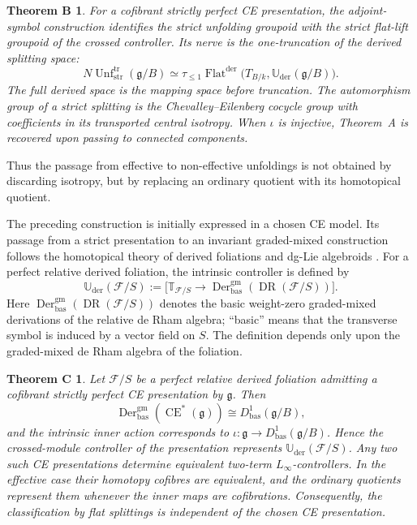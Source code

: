 \documentclass[11pt,reqno,a4paper,dvipsnames,x11names]{amsart}
\numberwithin{equation}{section}
\theoremstyle{plain}
\newtheorem*{theoremB}{Theorem B}
\newtheorem*{theoremC}{Theorem C}
\theoremstyle{definition}
\theoremstyle{remark}
\DeclareMathOperator{\Der}{Der}
\DeclareMathOperator{\CE}{CE}
\DeclareMathOperator{\DR}{DR}
\newcommand{\kk}{k}
\newcommand{\cF}{\mathcal F}
\newcommand{\g}{\mathfrak g}
\newcommand{\Uder}{\mathbb U_{\mathrm{der}}}
\newcommand{\bbT}{\mathbb T}
\newcommand{\gm}{\mathrm{gm}}
\newcommand{\bas}{\mathrm{bas}}
\newcommand{\tr}{\mathrm{tr}}
\newcommand{\from}{\colon}
\begin{document}
\begin{theoremB} 
For a cofibrant strictly perfect CE presentation, the adjoint-symbol construction identifies the strict unfolding groupoid with the strict flat-lift groupoid of the crossed controller. Its nerve is the one-truncation of the derived splitting space:
\[
 N\operatorname{Unf}^{\tr}_{\mathrm{str}}(\g/B)
 \simeq
 \tau_{\leq1}\operatorname{Flat}^{\mathrm{der}}
 \bigl(T_{B/\kk},\Uder(\g/B)\bigr).
\]
The full derived space is the mapping space before truncation. The automorphism group of a strict splitting is the Chevalley--Eilenberg cocycle group with coefficients in its transported central isotropy. When \(\iota\) is injective, Theorem~A is recovered upon passing to connected components.
\end{theoremB}

Thus the passage from effective to non-effective unfoldings is not obtained by discarding isotropy, but by replacing an ordinary quotient with its homotopical quotient.

\medskip
 
The preceding construction is initially expressed in a chosen CE model. Its passage from a strict presentation to an invariant graded-mixed construction follows the homotopical theory of derived foliations and dg-Lie algebroids \cite{HAGII,Nuiten,TV}. For a perfect relative derived foliation, the intrinsic controller is defined by
\[
 \Uder(\cF/S)
 :=
 \bigl[
   \bbT_{\cF/S}
   \longrightarrow
   \Der^{\gm}_{\bas}(\DR(\cF/S))
 \bigr].
\]
Here \(\Der^{\gm}_{\bas}(\DR(\cF/S))\) denotes the basic weight-zero graded-mixed derivations of the relative de Rham algebra; ``basic'' means that the transverse symbol is induced by a vector field on \(S\). The definition depends only upon the graded-mixed de Rham algebra of the foliation.

\begin{theoremC} 
Let \(\cF/S\) be a perfect relative derived foliation admitting a cofibrant strictly perfect CE presentation by \(\g\). Then
\[
 \Der^{\gm}_{\bas}(\CE^*(\g))
 \cong D^1_{\bas}(\g/B),
\]
and the intrinsic inner action corresponds to \(\iota\from\g\to D^1_{\bas}(\g/B)\). Hence the crossed-module controller of the presentation represents \(\Uder(\cF/S)\). Any two such CE presentations determine equivalent two-term \(L_\infty\)-controllers. In the effective case their homotopy cofibres are equivalent, and the ordinary quotients represent them whenever the inner maps are cofibrations. Consequently, the classification by flat splittings is independent of the chosen CE presentation.
\end{theoremC}
\end{document}
